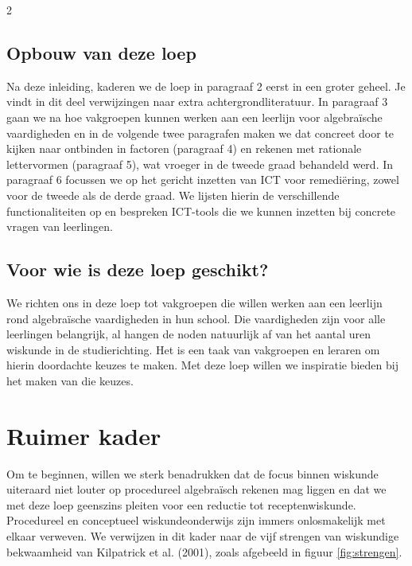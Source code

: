 \begin{multicols}{2}
\subsection{Opbouw van deze loep}
Na deze inleiding, kaderen we de loep in paragraaf 2 eerst in een groter geheel. Je vindt in dit deel verwijzingen naar extra achtergrondliteratuur. In paragraaf 3 gaan we na hoe vakgroepen kunnen werken aan een leerlijn voor algebraïsche vaardigheden en in de volgende twee paragrafen maken we dat concreet door te kijken naar ontbinden in factoren (paragraaf 4) en rekenen met rationale lettervormen (paragraaf 5), wat vroeger in de tweede graad behandeld werd. In paragraaf 6 focussen we op het gericht inzetten van ICT voor remediëring, zowel voor de tweede als de derde graad. We lijsten hierin de verschillende functionaliteiten op en bespreken ICT-tools die we kunnen inzetten bij concrete vragen van leerlingen.


\subsection{Voor wie is deze loep geschikt?}
We richten ons in deze loep tot vakgroepen die willen werken aan een leerlijn rond algebraïsche vaardigheden in hun school. Die vaardigheden zijn voor alle leerlingen belangrijk, al hangen de noden natuurlijk af van het aantal uren wiskunde in de studierichting. Het is een taak van vakgroepen en leraren om hierin doordachte keuzes te maken. Met deze loep willen we inspiratie bieden bij het maken van die keuzes.


\section{Ruimer kader}

Om te beginnen, willen we sterk benadrukken dat de focus binnen wiskunde uiteraard niet louter op procedureel algebraïsch rekenen mag liggen en dat we met deze loep geenszins pleiten voor een reductie tot receptenwiskunde. Procedureel en conceptueel wiskundeonderwijs zijn immers onlosmakelijk met elkaar verweven. We verwijzen in dit kader naar de vijf strengen van wiskundige bekwaamheid van Kilpatrick et al. (2001), zoals afgebeeld in figuur \ref{fig:strengen}.




\end{multicols}
